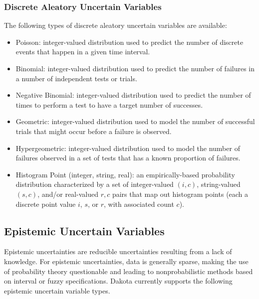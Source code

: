 \subsubsection{Discrete Aleatory Uncertain Variables}\label{variables:uncertain:dauv}

The following types of discrete aleatory uncertain variables are available:

\begin{itemize}

\item Poisson: integer-valued distribution used to predict the number of 
  discrete events that happen in a given time interval.

\item Binomial: integer-valued distribution used to predict 
  the number of failures in a number of independent tests or trials.

\item Negative Binomial: integer-valued distribution used to predict the
  number of times to perform a test to have a target number of successes.

\item Geometric: integer-valued distribution used to model the number of 
  successful trials that might occur before a failure is observed.

\item Hypergeometric: integer-valued distribution used to model the number 
  of failures observed in a set of tests that has a known proportion of 
  failures.

\item Histogram Point (integer, string, real): an empirically-based
  probability distribution characterized by a set of integer-valued
  $(i,c)$, string-valued $(s,c)$, and/or real-valued ${r,c}$ pairs
  that map out histogram points (each a discrete point value $i$, $s$,
  or $r$, with associated count $c$).

\end{itemize}


\subsection{Epistemic Uncertain Variables}\label{variables:uncertain:euv}

Epistemic uncertainties are reducible uncertainties resulting from a
lack of knowledge.  For epistemic uncertainties, data is generally
sparse, making the use of probability theory questionable and leading
to nonprobabilistic methods based on interval or fuzzy specifications.  Dakota
currently supports the following epistemic uncertain variable types.

